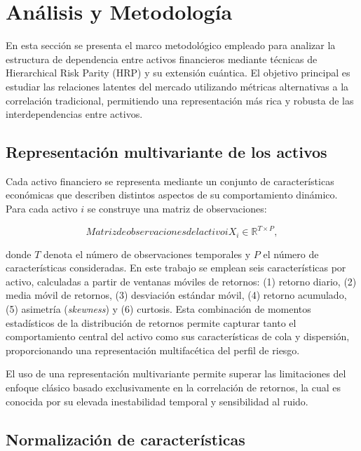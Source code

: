 \chapter{Análisis y Metodología}
\label{cap:analisis_metodologia}
En esta sección se presenta el marco metodológico empleado para analizar la estructura de dependencia entre activos financieros mediante técnicas de Hierarchical Risk Parity (HRP) y su extensión cuántica. El objetivo principal es estudiar las relaciones latentes del mercado utilizando métricas alternativas a la correlación tradicional, permitiendo una representación más rica y robusta de las interdependencias entre activos.

\section{Representación multivariante de los activos}
\label{sec:representacion_multivariante}

Cada activo financiero se representa mediante un conjunto de características económicas que describen distintos aspectos de su comportamiento dinámico. Para cada activo $i$ se construye una matriz de observaciones:

\begin{equation}[eq:matriz_observaciones]{Matriz de observaciones del activo i}
X_i \in \mathbb{R}^{T \times P},
\end{equation}

donde $T$ denota el número de observaciones temporales y $P$ el número de características consideradas. En este trabajo se emplean seis características por activo, calculadas a partir de ventanas móviles de retornos: (1) retorno diario, (2) media móvil de retornos, (3) desviación estándar móvil, (4) retorno acumulado, (5) asimetría (\textit{skewness}) y (6) curtosis. Esta combinación de momentos estadísticos de la distribución de retornos permite capturar tanto el comportamiento central del activo como sus características de cola y dispersión, proporcionando una representación multifacética del perfil de riesgo.

El uso de una representación multivariante permite superar las limitaciones del enfoque clásico basado exclusivamente en la correlación de retornos, la cual es conocida por su elevada inestabilidad temporal y sensibilidad al ruido.

\section{Normalización de características}
\label{sec:normalizacion_caracteristicas}

